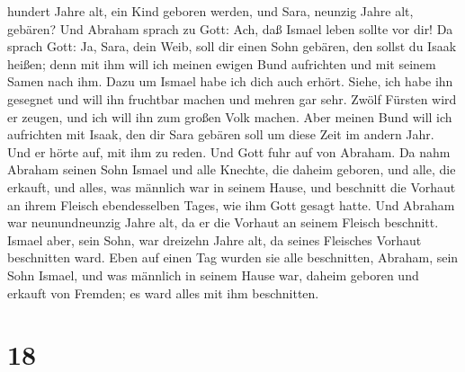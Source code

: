 hundert Jahre alt, ein Kind geboren werden, und Sara, neunzig Jahre alt,
gebären?  Und Abraham sprach zu Gott: Ach, daß Ismael leben
sollte vor dir!  Da sprach Gott: Ja, Sara, dein Weib, soll
dir einen Sohn gebären, den sollst du Isaak heißen; denn mit ihm will
ich meinen ewigen Bund aufrichten und mit seinem Samen nach ihm.
 Dazu um Ismael habe ich dich auch erhört. Siehe, ich habe
ihn gesegnet und will ihn fruchtbar machen und mehren gar sehr. Zwölf
Fürsten wird er zeugen, und ich will ihn zum großen Volk machen.
 Aber meinen Bund will ich aufrichten mit Isaak, den dir
Sara gebären soll um diese Zeit im andern Jahr.  Und er
hörte auf, mit ihm zu reden. Und Gott fuhr auf von Abraham.
 Da nahm Abraham seinen Sohn Ismael und alle Knechte, die
daheim geboren, und alle, die erkauft, und alles, was männlich war in
seinem Hause, und beschnitt die Vorhaut an ihrem Fleisch ebendesselben
Tages, wie ihm Gott gesagt hatte.  Und Abraham war
neunundneunzig Jahre alt, da er die Vorhaut an seinem Fleisch beschnitt.
 Ismael aber, sein Sohn, war dreizehn Jahre alt, da seines
Fleisches Vorhaut beschnitten ward.  Eben auf einen Tag
wurden sie alle beschnitten, Abraham, sein Sohn Ismael, 
und was männlich in seinem Hause war, daheim geboren und erkauft von
Fremden; es ward alles mit ihm beschnitten.

\hypertarget{section-17}{%
\section{18}\label{section-17}}

